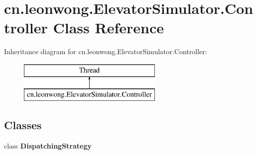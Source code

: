 \hypertarget{classcn_1_1leonwong_1_1_elevator_simulator_1_1_controller}{}\section{cn.\+leonwong.\+Elevator\+Simulator.\+Controller Class Reference}
\label{classcn_1_1leonwong_1_1_elevator_simulator_1_1_controller}
Inheritance diagram for cn.\+leonwong.\+Elevator\+Simulator.\+Controller\+:\begin{figure}[H]
\begin{center}
\leavevmode
\includegraphics[height=2.000000cm]{classcn_1_1leonwong_1_1_elevator_simulator_1_1_controller}
\end{center}
\end{figure}
\subsection*{Classes}
\begin{DoxyCompactItemize}
\item 
class {\bfseries Dispatching\+Strategy}
\end{DoxyCompactItemize}
